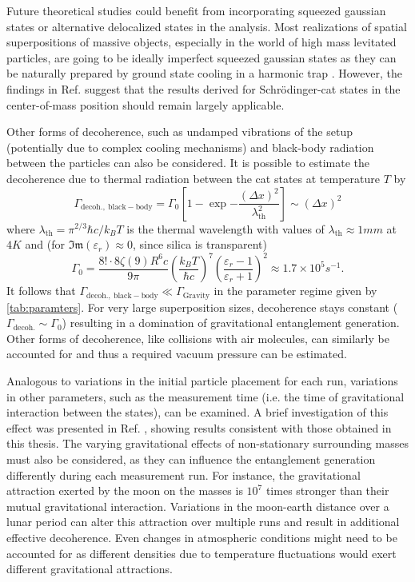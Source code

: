 Future theoretical studies could benefit from incorporating squeezed gaussian states \cite[p. 33-64]{Serafini_2017} or alternative delocalized states in the analysis.
Most realizations of spatial superpositions of massive objects, especially in the world of high mass levitated particles, are going to be ideally imperfect squeezed gaussian states \cite[Timestamp: 23:00]{Aspelmeyer_2024} as they can be naturally prepared by ground state cooling in a harmonic trap \cite{Weiss_2021}.
However, the findings in Ref. \cite{Pedernales_2023} suggest that the results derived for Schrödinger-cat states in the center-of-mass position should remain largely applicable.

Other forms of decoherence, such as undamped vibrations of the setup (potentially due to complex cooling mechanisms) and black-body radiation between the particles can also be considered.
It is possible to estimate the decoherence due to thermal radiation \cite[p. 127-136]{Schlosshauer_2007} between the cat states at temperature $T$ by \cite{RomeroIsart_2011}
\begin{equation}
  \Gamma_\mathrm{decoh.,\ black-body} = \Gamma_0\left[1 - \exp{-\frac{(\Delta x)^2}{\lambda^2_\mathrm{th}}}\right] \sim (\Delta x)^2
\end{equation}
where $\lambda_\mathrm{th} = \pi^{2/3} \hbar c / k_B T$ is the thermal wavelength with values of $\lambda_\mathrm{th} \approx 1\si{mm}$ at $4\si{K}$ and (for $\mathfrak{Im}(\varepsilon_r)\approx 0$, since silica is transparent)
\begin{equation}
  \Gamma_0 = \frac{8! \cdot 8 \zeta(9)R^6c}{9\pi} \left(\frac{k_B T}{\hbar c}\right)^7 \left(\frac{\varepsilon_r - 1}{\varepsilon_r + 1}\right)^2 \approx 1.7 \times 10^{5} \si{s^{-1}} .
\end{equation}
It follows that $\Gamma_\mathrm{decoh.,\ black-body} \ll \Gamma_\mathrm{Gravity}$ in the parameter regime given by \cref{tab:paramters}.
For very large superposition sizes, decoherence stays constant ($\Gamma_\mathrm{decoh.}\sim \Gamma_0$) resulting in a domination of gravitational entanglement generation.
Other forms of decoherence, like collisions with air molecules, can similarly be accounted for and thus a required vacuum pressure can be estimated.

Analogous to variations in the initial particle placement for each run, variations in other parameters, such as the measurement time (i.e. the time of gravitational interaction between the states), can be examined.
A brief investigation of this effect was presented in Ref. \cite{Nguyen_2020}, showing results consistent with those obtained in this thesis.
The varying gravitational effects of non-stationary surrounding masses must also be considered, as they can influence the entanglement generation differently during each measurement run. For instance, the gravitational attraction exerted by the moon on the masses is $10^7$ times stronger than their mutual gravitational interaction.
Variations in the moon-earth distance over a lunar period can alter this attraction over multiple runs and result in additional effective decoherence.
Even changes in atmospheric conditions might need to be accounted for as different densities due to temperature fluctuations would exert different gravitational attractions.

